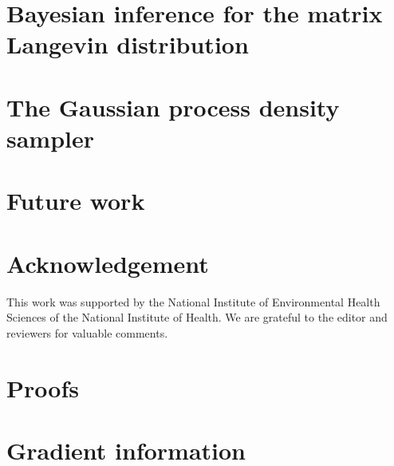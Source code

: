 \documentclass[lineno]{biometrika}
\begin{document}
\section{Bayesian inference for the matrix Langevin distribution} \label{sec:Bays_inf}





\section{The Gaussian process density sampler}\label{sec:gpds}



\section{Future work}\label{sec:conc}



\section*{Acknowledgement}
This work was supported by the National Institute of Environmental Health Sciences of the National Institute of Health.
We are grateful to the editor and reviewers for valuable comments.


\appendix
\section{Proofs}
 \label{sec:proofs}
% 

\section{Gradient information}
 \label{sec:gradient}



%

\end{document}
